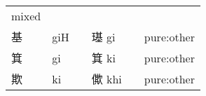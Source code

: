 \documentclass[14pt,a4paper]{scrartcl}
\begin{document}
\begin{longtable}[c]{@{}llllll@{}}
\begin{minipage}[t]{0.14\columnwidth}
mixed
\strut\end{minipage}\tabularnewline
\begin{minipage}[t]{0.14\columnwidth}\raggedright\strut
基
\strut\end{minipage} &
\begin{minipage}[t]{0.14\columnwidth}\raggedright\strut
giH
\strut\end{minipage} &
\begin{minipage}[t]{0.14\columnwidth}\raggedright\strut
\strut\end{minipage} &
\begin{minipage}[t]{0.14\columnwidth}\raggedright\strut
璂 gi
\strut\end{minipage} &
\begin{minipage}[t]{0.14\columnwidth}\raggedright\strut
\strut\end{minipage} &
\begin{minipage}[t]{0.14\columnwidth}\raggedright\strut
pure:other
\strut\end{minipage}\tabularnewline
\begin{minipage}[t]{0.14\columnwidth}\raggedright\strut
箕
\strut\end{minipage} &
\begin{minipage}[t]{0.14\columnwidth}\raggedright\strut
gi
\strut\end{minipage} &
\begin{minipage}[t]{0.14\columnwidth}\raggedright\strut
\strut\end{minipage} &
\begin{minipage}[t]{0.14\columnwidth}\raggedright\strut
箕 ki
\strut\end{minipage} &
\begin{minipage}[t]{0.14\columnwidth}\raggedright\strut
\strut\end{minipage} &
\begin{minipage}[t]{0.14\columnwidth}\raggedright\strut
pure:other
\strut\end{minipage}\tabularnewline
\begin{minipage}[t]{0.14\columnwidth}\raggedright\strut
欺
\strut\end{minipage} &
\begin{minipage}[t]{0.14\columnwidth}\raggedright\strut
ki
\strut\end{minipage} &
\begin{minipage}[t]{0.14\columnwidth}\raggedright\strut
\strut\end{minipage} &
\begin{minipage}[t]{0.14\columnwidth}\raggedright\strut
僛 khi
\strut\end{minipage} &
\begin{minipage}[t]{0.14\columnwidth}\raggedright\strut
\strut\end{minipage} &
\begin{minipage}[t]{0.14\columnwidth}\raggedright\strut
pure:other
\strut\end{minipage}\tabularnewline
\bottomrule
\end{longtable}
\end{document}
